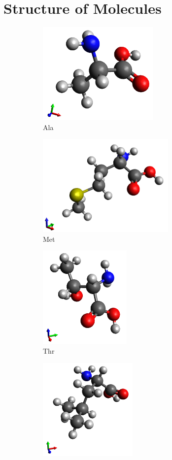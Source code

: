 \section{Structure of Molecules}
\begin{figure}
\begin{subfigure}{.5\textwidth}
  \centering
  \includegraphics[height=5cm]{Figures/Ala.png}
  \caption{Ala}
  \label{fig:sfig1}
\end{subfigure}%
\begin{subfigure}{.5\textwidth}
  \centering
  \includegraphics[height=5cm]{Figures/Met.png}
  \caption{Met}
  \label{fig:sfig2}
\end{subfigure}
\begin{subfigure}{.5\textwidth}
  \centering
  \includegraphics[height=5cm]{Figures/Thr.png}
  \caption{Thr}
  \label{fig:sfig3}
\end{subfigure}
\begin{subfigure}{.5\textwidth}
  \centering
  \includegraphics[height=5cm]{Figures/Leu.png}

\end{subfigure}
\end{figure}
